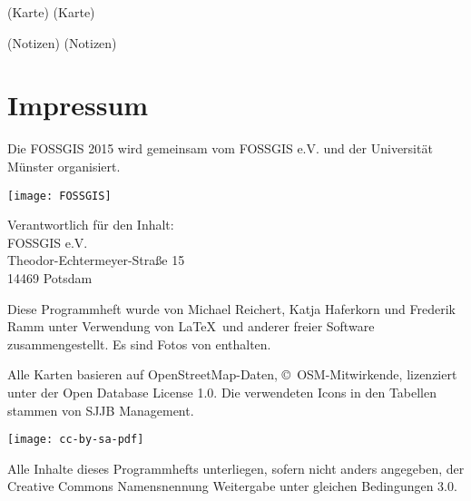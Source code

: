 \newpage
(Karte)
\label{karte}
\newpage
(Karte)
\newpage


\newpage
(Notizen)
\newpage
(Notizen)
\newpage


\newpage
\section*{Impressum}
\label{impressum}
\vspace{-0.5em}


\begin{raggedright}
Die FOSSGIS 2015 wird gemeinsam vom FOSSGIS e.V. und der Universität Münster 
organisiert.

\vspace{0.5em}
	\texttt{[image: FOSSGIS]}

\vspace{0.5em}
\noindent Verantwortlich für den Inhalt:\\
FOSSGIS e.V.\\
Theodor-Echtermeyer-Straße 15\\
14469 Potsdam

\vspace{1em}
\noindent Diese Programmheft wurde von Michael Reichert, Katja Haferkorn und 
Frederik Ramm unter Verwendung von \LaTeX\ und anderer freier Software zusammengestellt. Es sind Fotos von %
enthalten.

\vspace{0.5em}

\noindent Alle Karten basieren auf Open\-Street\-Map-Daten, 
\mbox{\copyright\ OSM}-Mitwirkende, lizenziert unter der Open Database License 1.0.
Die verwendeten Icons in den Tabellen stammen von SJJB Management.


\vspace{1em}
\noindent \begin{minipage}[htbp]{0.2\textwidth}
\noindent\texttt{[image: cc-by-sa-pdf]}
\end{minipage}
\hfill
\begin{minipage}[hbtp]{0.74\textwidth}
Alle Inhalte dieses Programmhefts unterliegen, sofern nicht anders angegeben, 
der Creative Commons Namensnennung Weitergabe unter gleichen Bedingungen 3.0.
\end{minipage}
\end{raggedright}

